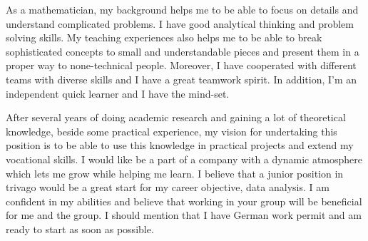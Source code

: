 \documentclass[12pt,a4paper,sans]{moderncv}        %
\begin{document}




As a mathematician, my background helps me to be able to focus on details and understand complicated problems. I have good analytical thinking and problem solving skills. My teaching experiences also helps me to be able to break sophisticated concepts to small and understandable pieces and present them in a proper way to none-technical people. Moreover, I have cooperated with different teams with diverse skills and I have a great teamwork spirit. In addition, I’m an independent quick learner and I have the mind-set. 


After several years of doing academic research and gaining a lot of theoretical knowledge, beside some practical experience, my vision for undertaking this position is to be able to use this knowledge in practical projects and extend my vocational skills. I would like be a part of  a company with a dynamic atmosphere which lets me grow while helping me learn. I believe that a junior position in trivago would be a great start for my career objective, data analysis. I am confident in my abilities and believe that working in your group will be beneficial for me and the group. I should mention that I have German work permit and am ready to start as soon as possible.

 \vspace{3mm}
 
\makeletterclosing
\end{document}
